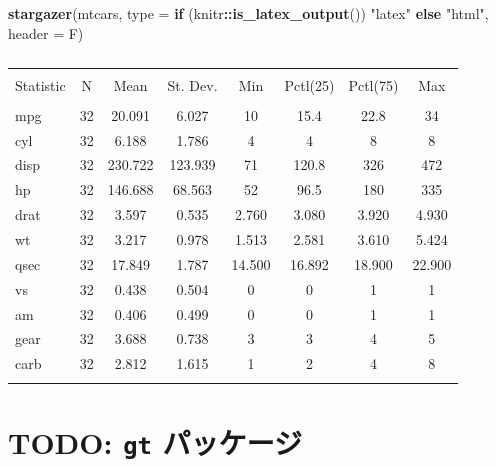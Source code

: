 \documentclass[
  nomag]{bxjsbook}
\newenvironment{Shaded}{\begin{snugshade}}{\end{snugshade}}
\newcommand{\ControlFlowTok}[1]{\textcolor[rgb]{0.13,0.29,0.53}{\textbf{#1}}}
\newcommand{\DataTypeTok}[1]{\textcolor[rgb]{0.13,0.29,0.53}{#1}}
\newcommand{\KeywordTok}[1]{\textcolor[rgb]{0.13,0.29,0.53}{\textbf{#1}}}
\newcommand{\NormalTok}[1]{#1}
\newcommand{\OperatorTok}[1]{\textcolor[rgb]{0.81,0.36,0.00}{\textbf{#1}}}
\newcommand{\StringTok}[1]{\textcolor[rgb]{0.31,0.60,0.02}{#1}}
\theoremstyle{definition}
\theoremstyle{definition}
\theoremstyle{definition}
\theoremstyle{remark}
\begin{document}
\begin{Shaded}
\begin{Highlighting}[numbers=left,,]
\KeywordTok{stargazer}\NormalTok{(mtcars, }\DataTypeTok{type =} \ControlFlowTok{if}\NormalTok{ (knitr}\OperatorTok{::}\KeywordTok{is\_latex\_output}\NormalTok{()) }\StringTok{"latex"} \ControlFlowTok{else} \StringTok{"html"}\NormalTok{, }\DataTypeTok{header =}\NormalTok{ F)}
\end{Highlighting}
\end{Shaded}

\begin{table}[!htbp] \centering 
  \caption{} 
  \label{} 
\begin{tabular}{@{\extracolsep{5pt}}lccccccc} 
\\[-1.8ex]\hline 
\hline \\[-1.8ex] 
Statistic & \multicolumn{1}{c}{N} & \multicolumn{1}{c}{Mean} & \multicolumn{1}{c}{St. Dev.} & \multicolumn{1}{c}{Min} & \multicolumn{1}{c}{Pctl(25)} & \multicolumn{1}{c}{Pctl(75)} & \multicolumn{1}{c}{Max} \\ 
\hline \\[-1.8ex] 
mpg & 32 & 20.091 & 6.027 & 10 & 15.4 & 22.8 & 34 \\ 
cyl & 32 & 6.188 & 1.786 & 4 & 4 & 8 & 8 \\ 
disp & 32 & 230.722 & 123.939 & 71 & 120.8 & 326 & 472 \\ 
hp & 32 & 146.688 & 68.563 & 52 & 96.5 & 180 & 335 \\ 
drat & 32 & 3.597 & 0.535 & 2.760 & 3.080 & 3.920 & 4.930 \\ 
wt & 32 & 3.217 & 0.978 & 1.513 & 2.581 & 3.610 & 5.424 \\ 
qsec & 32 & 17.849 & 1.787 & 14.500 & 16.892 & 18.900 & 22.900 \\ 
vs & 32 & 0.438 & 0.504 & 0 & 0 & 1 & 1 \\ 
am & 32 & 0.406 & 0.499 & 0 & 0 & 1 & 1 \\ 
gear & 32 & 3.688 & 0.738 & 3 & 3 & 4 & 5 \\ 
carb & 32 & 2.812 & 1.615 & 1 & 2 & 4 & 8 \\ 
\hline \\[-1.8ex] 
\end{tabular} 
\end{table}

\hypertarget{todo-gt-ux30d1ux30c3ux30b1ux30fcux30b8}{%
\section{\texorpdfstring{TODO: \texttt{gt}
パッケージ}{TODO: gt パッケージ}}\label{todo-gt-ux30d1ux30c3ux30b1ux30fcux30b8}}
\end{document}

